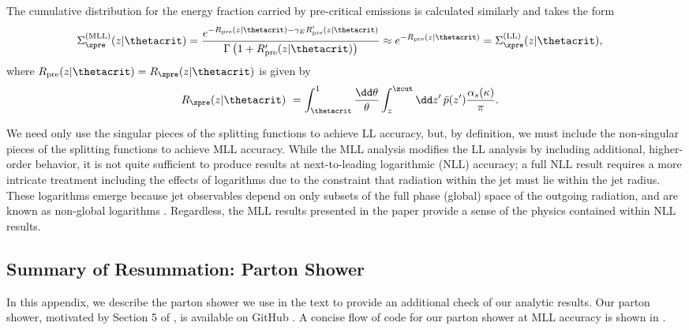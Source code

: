 \documentclass[letterpaper,11pt]{article}
\begin{document}
The cumulative distribution for the energy fraction carried by pre-critical emissions is calculated similarly and takes the form
%
\begin{align}
    \Sigma^{\rm(MLL)}_{\zpre}
    (z | \thetacrit)
    &=
   \frac{
   e^{-R_{\rm pre}(z | \thetacrit)
   -
   \gamma_E R'_{\rm pre}(z | \thetacrit)}
   }
   {\Gamma
   \left(1 + R'_{\rm pre}(z | \thetacrit)\right)
   }
   \approx
   e^{-R_{\rm pre}(z | \thetacrit)}
   =
   \Sigma^{\rm(LL)}_{\zpre}
   (z  |  \thetacrit)
   \label{eqn:preDist}
   ,
\end{align}
%
where \(R_{\rm pre}(z | \thetacrit) = R_{\zpre}(z | \thetacrit)\) is given by
%
\begin{align}
    R_{\zpre}
    (z | \thetacrit)\
    &=
    \int_{\thetacrit}^{1}
    \frac{\dd\theta}{\theta}
    \int_{z}^{\zcut}\dd z'\,
    \bar{p}(z')
    \frac{\alpha_s(\kappa)}{\pi}
    .
\end{align}

We need only use the singular pieces of the splitting functions to achieve LL accuracy, but, by definition, we must include the non-singular pieces of the splitting functions to achieve MLL accuracy.
%
While the MLL analysis modifies the LL analysis by including additional, higher-order behavior, it is not quite sufficient to produce results at next-to-leading logarithmic (NLL) accuracy;
%
a full NLL result requires a more intricate treatment including the effects of logarithms due to the constraint that radiation within the jet must lie within the jet radius.
%
These logarithms emerge because jet observables depend on only subsets of the full phase (global) space of the outgoing radiation, and are known as non-global logarithms \cite{Dasgupta:2001sh,Dasgupta:2002dc,Dasgupta:2002bw,Banfi:2002hw,Appleby:2002ke,Weigert:2003mm,Rubin:2010fc,Banfi:2010pa,Kelley:2011tj,Hornig:2011iu,Kelley:2011aa,Hatta:2013iba,Schwartz:2014wha,Khelifa-Kerfa:2015mma,Larkoski:2015zka,Larkoski:2016zzc,Banfi:2021owj}.
%
Regardless, the MLL results presented in the paper provide a sense of the physics contained within NLL results.


\subsection{Summary of Resummation: Parton Shower}
\label{app:partonshower}

In this appendix, we describe the parton shower we use in the text to provide an additional check of our analytic results.
%
Our parton shower, motivated by Section 5 of , is available on GitHub \cite{samgithub}.
%
A concise flow of code for our parton shower at MLL accuracy is shown in .
\end{document}
